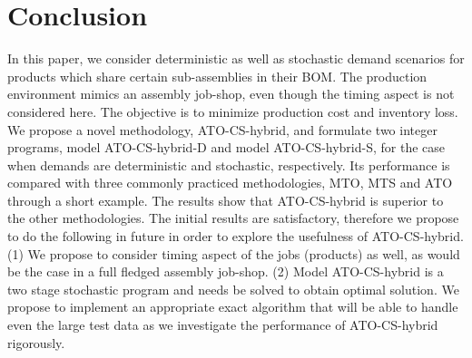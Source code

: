 \documentclass[twoside,onecolumn,12pt,letterpaper]{article}
\begin{document}
\section{Conclusion \label{sec:conclusion}}

In this paper, we consider deterministic as well as stochastic demand scenarios for products which share certain sub-assemblies in their BOM. The production environment mimics an assembly job-shop, even though the timing aspect is not considered here. The objective is to minimize production cost and inventory loss. We propose a novel methodology, ATO-CS-hybrid, and formulate two integer programs, model ATO-CS-hybrid-D and model ATO-CS-hybrid-S, for the case when demands are deterministic and stochastic, respectively. Its performance is compared with three commonly practiced methodologies, MTO, MTS and ATO through a short example. The results show that ATO-CS-hybrid is superior to the other methodologies. The initial results are satisfactory, therefore we propose to do the following in future in order to explore the usefulness of ATO-CS-hybrid. (1) We propose to consider timing aspect of the jobs (products) as well, as would be the case in a full fledged assembly job-shop. (2) Model ATO-CS-hybrid is a two stage stochastic program and needs be solved to obtain optimal solution. We propose to implement an appropriate exact algorithm that will be able to handle even the large test data as we investigate the performance of ATO-CS-hybrid rigorously.


\end{document}
